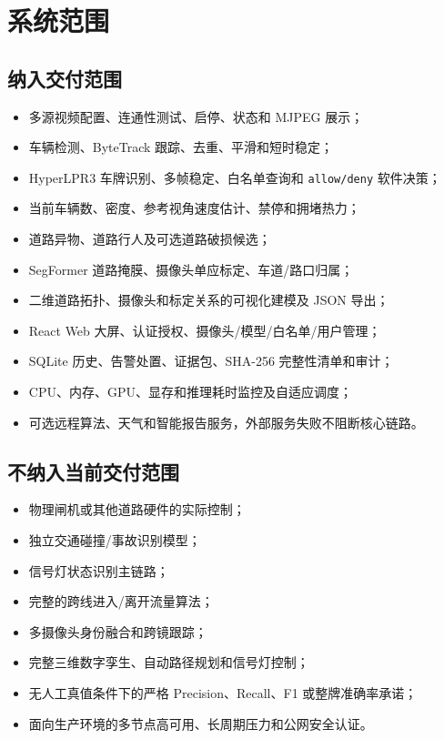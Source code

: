 \section{系统范围}\label{requirements-ux7cfbux7edfux8303ux56f4}

\subsection{纳入交付范围}\label{requirements-ux7eb3ux5165ux4ea4ux4ed8ux8303ux56f4}

\begin{itemize}
\tightlist
\item
  多源视频配置、连通性测试、启停、状态和 MJPEG 展示；
\item
  车辆检测、ByteTrack 跟踪、去重、平滑和短时稳定；
\item
  HyperLPR3 车牌识别、多帧稳定、白名单查询和 \texttt{allow/\allowbreak{}deny} 软件决策；
\item
  当前车辆数、密度、参考视角速度估计、禁停和拥堵热力；
\item
  道路异物、道路行人及可选道路破损候选；
\item
  SegFormer 道路掩膜、摄像头单应标定、车道/路口归属；
\item
  二维道路拓扑、摄像头和标定关系的可视化建模及 JSON 导出；
\item
  React Web 大屏、认证授权、摄像头/模型/白名单/用户管理；
\item
  SQLite 历史、告警处置、证据包、SHA-256 完整性清单和审计；
\item
  CPU、内存、GPU、显存和推理耗时监控及自适应调度；
\item
  可选远程算法、天气和智能报告服务，外部服务失败不阻断核心链路。
\end{itemize}

\subsection{不纳入当前交付范围}\label{requirements-ux4e0dux7eb3ux5165ux5f53ux524dux4ea4ux4ed8ux8303ux56f4}

\begin{itemize}
\tightlist
\item
  物理闸机或其他道路硬件的实际控制；
\item
  独立交通碰撞/事故识别模型；
\item
  信号灯状态识别主链路；
\item
  完整的跨线进入/离开流量算法；
\item
  多摄像头身份融合和跨镜跟踪；
\item
  完整三维数字孪生、自动路径规划和信号灯控制；
\item
  无人工真值条件下的严格 Precision、Recall、F1 或整牌准确率承诺；
\item
  面向生产环境的多节点高可用、长周期压力和公网安全认证。
\end{itemize}

